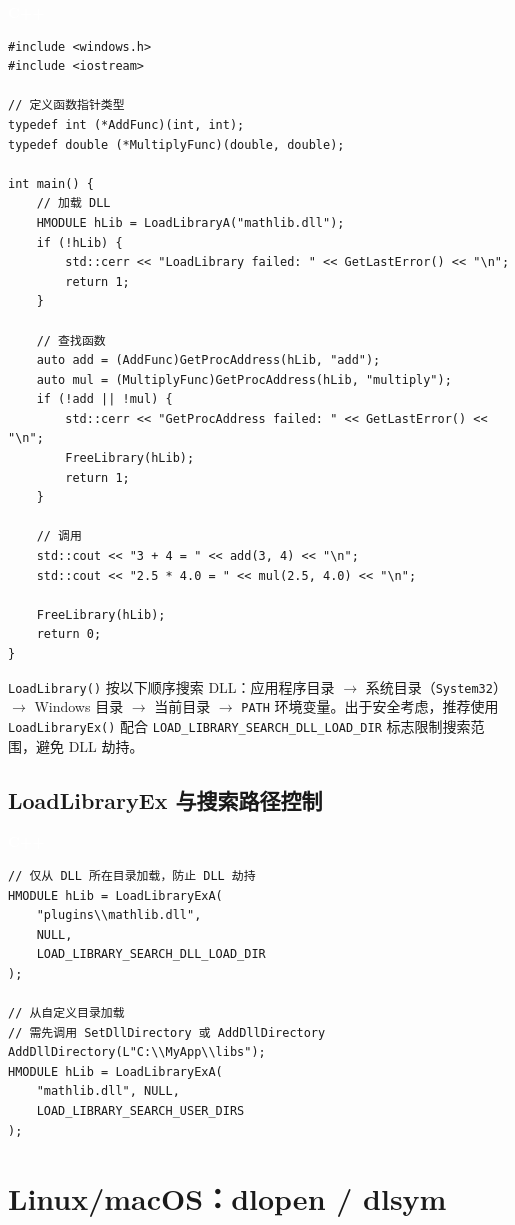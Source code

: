 \documentclass[12pt,a4paper,fontset=fandol]{ctexbook}
\newcommand{\cpplabel}{%
  \begin{tcolorbox}[enhanced,colback=cppheadbg,colframe=cppheadbg,
    arc=1mm,boxrule=0mm,left=6pt,right=6pt,top=2pt,bottom=2pt,
    halign=left,oversize]
    \textcolor{white}{\small\bfseries C++}
  \end{tcolorbox}\vspace{-4pt}}
\newcommand{\Fn}[1]{\texttt{#1()}}
\begin{document}
\cpplabel
\begin{lstlisting}[style=cppstyle]
#include <windows.h>
#include <iostream>

// 定义函数指针类型
typedef int (*AddFunc)(int, int);
typedef double (*MultiplyFunc)(double, double);

int main() {
    // 加载 DLL
    HMODULE hLib = LoadLibraryA("mathlib.dll");
    if (!hLib) {
        std::cerr << "LoadLibrary failed: " << GetLastError() << "\n";
        return 1;
    }

    // 查找函数
    auto add = (AddFunc)GetProcAddress(hLib, "add");
    auto mul = (MultiplyFunc)GetProcAddress(hLib, "multiply");
    if (!add || !mul) {
        std::cerr << "GetProcAddress failed: " << GetLastError() << "\n";
        FreeLibrary(hLib);
        return 1;
    }

    // 调用
    std::cout << "3 + 4 = " << add(3, 4) << "\n";
    std::cout << "2.5 * 4.0 = " << mul(2.5, 4.0) << "\n";

    FreeLibrary(hLib);
    return 0;
}
\end{lstlisting}

\begin{tcolorbox}[note={LoadLibrary 搜索顺序}]
\Fn{LoadLibrary} 按以下顺序搜索 DLL：应用程序目录 $\to$ 系统目录（\texttt{System32}）$\to$ Windows 目录 $\to$ 当前目录 $\to$ \texttt{PATH} 环境变量。出于安全考虑，推荐使用 \Fn{LoadLibraryEx} 配合 \texttt{LOAD\_LIBRARY\_SEARCH\_DLL\_LOAD\_DIR} 标志限制搜索范围，避免 DLL 劫持。
\end{tcolorbox}

\subsection{LoadLibraryEx 与搜索路径控制}

\cpplabel
\begin{lstlisting}[style=cppstyle]
// 仅从 DLL 所在目录加载，防止 DLL 劫持
HMODULE hLib = LoadLibraryExA(
    "plugins\\mathlib.dll",
    NULL,
    LOAD_LIBRARY_SEARCH_DLL_LOAD_DIR
);

// 从自定义目录加载
// 需先调用 SetDllDirectory 或 AddDllDirectory
AddDllDirectory(L"C:\\MyApp\\libs");
HMODULE hLib = LoadLibraryExA(
    "mathlib.dll", NULL,
    LOAD_LIBRARY_SEARCH_USER_DIRS
);
\end{lstlisting}

\section{Linux/macOS：dlopen / dlsym}
\end{document}
